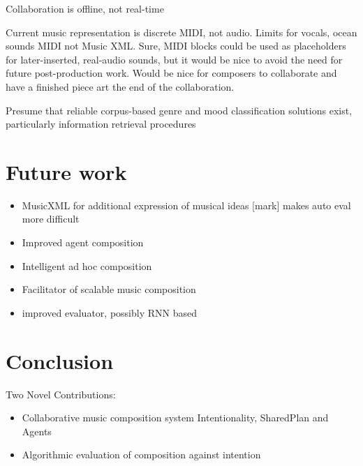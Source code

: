 \documentclass[final,authoryear,5p,times,twocolumn]{elsarticle}
\begin{document}
Collaboration is offline, not real-time

Current music representation is discrete MIDI, not audio. Limits for vocals, ocean sounds
MIDI not Music XML. Sure, MIDI blocks could be used as placeholders for later-inserted, real-audio sounds, but it would be nice to avoid the need for future post-production work. Would be nice for composers to collaborate and have a finished piece art the end of the collaboration.

Presume that reliable corpus-based genre and mood classification solutions exist, particularly information retrieval procedures

\section {Future work}

 
\begin{itemize}
\item MusicXML for additional expression of musical ideas [mark] makes auto eval more difficult
\item Improved agent composition
\item Intelligent ad hoc composition
\item Facilitator of scalable music composition
\item improved evaluator, possibly RNN based
\end{itemize}

\section{Conclusion}

 
 Two Novel Contributions:
 \begin{itemize}
\item Collaborative music composition system 
Intentionality, SharedPlan and Agents
\item Algorithmic evaluation of composition against intention
\end{itemize}




\end{document}
